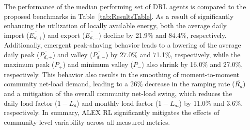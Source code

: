 \documentclass[preprint, 12pt]{elsarticle}
\begin{document}
The performance of the median performing set of DRL agents is compared to the proposed benchmarks in Table~\ref{tab:ResultsTable}.
%
As a result of significantly enhancing the utilization of locally available energy, both the average daily import ($\overline{E_{d, +}}$) and export ($\overline{E_{d, -}}$) decline by 21.9\% and 84.4\%, respectively. Additionally, emergent peak-shaving behavior leads to a lowering of the average daily peak ($\overline{P_{d,+}}$) and valley ($\overline{P_{d,-}}$) by 27.0\% and 71.1\%, respectively, while the maximum peak ($P_{+}$) and minimum valley ($P_{-}$) also shrink by 16.0\% and 27.0\%, respectively. This behavior also results in the smoothing of moment-to-moment community net-load demand, leading to a 26\% decrease in the ramping rate ($\overline{R_{d}}$) and a mitigation of the overall community net-load swing, which reduces the daily load factor ($1-L_{d}$) and monthly load factor ($1-L_{m}$) by 11.0\% and 3.6\%, respectively. In summary, ALEX RL significantly mitigates the effects of community-level variability across all measured metrics.
\end{document}
